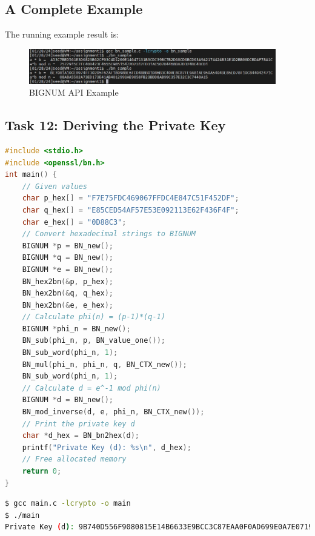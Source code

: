 \documentclass[a4paper,11pt]{article}
\begin{document}
\subsection{A Complete Example}
The running example result is:
\begin{figure}[h]
    \centering
       \includegraphics[width=0.96\textwidth]{figures/bignumresult.png}
    \caption{BIGNUM API Example}\label{fig:bignumexample}
\end{figure}

\subsection{Task 12: Deriving the Private Key}
\begin{lstlisting}[caption={C Program Code for Deriving the Private Key},label={lst:task4.12},language=C,breaklines=true]
#include <stdio.h>
#include <openssl/bn.h>
int main() {
    // Given values
    char p_hex[] = "F7E75FDC469067FFDC4E847C51F452DF";
    char q_hex[] = "E85CED54AF57E53E092113E62F436F4F";
    char e_hex[] = "0D88C3";
    // Convert hexadecimal strings to BIGNUM
    BIGNUM *p = BN_new();
    BIGNUM *q = BN_new();
    BIGNUM *e = BN_new();
    BN_hex2bn(&p, p_hex);
    BN_hex2bn(&q, q_hex);
    BN_hex2bn(&e, e_hex);
    // Calculate phi(n) = (p-1)*(q-1)
    BIGNUM *phi_n = BN_new();
    BN_sub(phi_n, p, BN_value_one());
    BN_sub_word(phi_n, 1);
    BN_mul(phi_n, phi_n, q, BN_CTX_new());
    BN_sub_word(phi_n, 1);
    // Calculate d = e^-1 mod phi(n)
    BIGNUM *d = BN_new();
    BN_mod_inverse(d, e, phi_n, BN_CTX_new());
    // Print the private key d
    char *d_hex = BN_bn2hex(d);
    printf("Private Key (d): %s\n", d_hex);
    // Free allocated memory
    return 0;
}
\end{lstlisting} 
\begin{lstlisting}[caption={Result of the Task 12},label={lst:task4.12-2},language=BASH,breaklines=true]
$ gcc main.c -lcrypto -o main
$ ./main
Private Key (d): 9B740D556F9080815E14B6633E9BCC3C87EAA0F0AD699E0A7E0719A725A94AA7
\end{lstlisting} 
\end{document}
